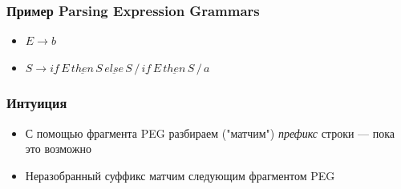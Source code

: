 \documentclass{beamer}
\begin{document}
\begin{frame}[fragile]
  \transwipe[direction=90]
  \frametitle{Пример Parsing Expression Grammars}
  \begin{itemize}
    \item $E \rightarrow b $
    \item $S \rightarrow \underline{if} \, E \, \underline{then} \, S \, \underline{else} \, S \, / \, \underline{if} \, E \, \underline{then} \, S \, / \, a$    
  \end{itemize}
\end{frame}

\begin{frame}[fragile]
  \transwipe[direction=90]
  \frametitle{Интуиция}
  \begin{itemize}
    \item С помощью фрагмента PEG разбираем ("матчим") \textit{префикс} строки --- пока это возможно
    \item Неразобранный суффикс матчим следующим фрагментом PEG
  \end{itemize}
\end{frame}
\end{document}
